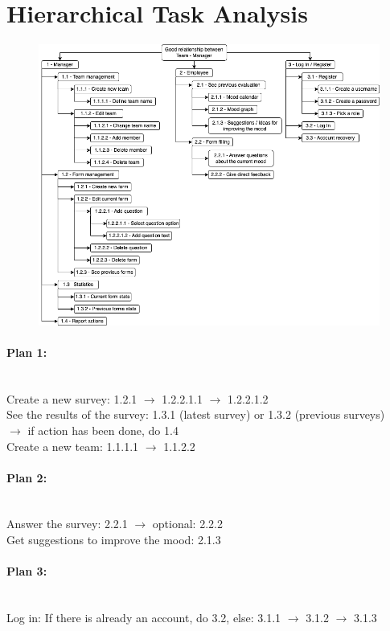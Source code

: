 \documentclass[11pt]{article}
\begin{document}
\section{Hierarchical Task Analysis}
\begin{figure}[!h]
    \centering
    \includegraphics[scale = 0.5]{figures/HTA.png}
\end{figure}


\paragraph{Plan 1:}\mbox{}\\
Create a new survey: 1.2.1 $\rightarrow$ 1.2.2.1.1 $\rightarrow$ 1.2.2.1.2\\
See the results of the survey: 1.3.1 (latest survey) or 1.3.2 (previous surveys) \\ \hspace*{50mm}  $\rightarrow$ if action has been done, do 1.4\\
Create a new team: 1.1.1.1 $\rightarrow$ 1.1.2.2 
 
\paragraph{Plan 2:}\mbox{}\\
Answer the survey: 2.2.1 $\rightarrow$ optional: 2.2.2\\
Get suggestions to improve the mood: 2.1.3

\paragraph{Plan 3:}\mbox{}\\
Log in: If there is already an account, do 3.2, else: 3.1.1 $\rightarrow$ 3.1.2 $\rightarrow$ 3.1.3 
\end{document}
